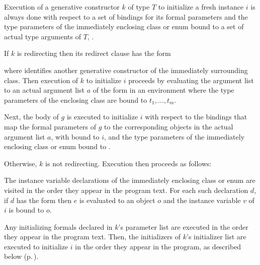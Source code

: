 \documentclass[makeidx]{article}
\begin{document}
\LMHash{}%
%
Execution of a generative constructor $k$ of type $T$
to initialize a fresh instance $i$
is always done with respect to a set of bindings for its formal parameters
and the type parameters of the immediately enclosing class or enum bound to
a set of actual type arguments of $T$, .


\LMHash{}%
If $k$ is redirecting then its redirect clause has the form

\noindent
{}

where  identifies another generative constructor
of the immediately surrounding class.
Then execution of $k$ to initialize $i$ proceeds by
evaluating the argument list
to an actual argument list $a$ of the form
in an environment where the
type parameters of the enclosing class are bound to
$t_1, \ldots, t_m$.

\LMHash{}%
Next, the body of $g$ is executed to initialize $i$
with respect to the bindings that map
the formal parameters of $g$ to the corresponding objects
in the actual argument list $a$,
with \THIS{} bound to $i$,
and the type parameters of the immediately enclosing class or enum bound to
.

\LMHash{}%
Otherwise, $k$ is not redirecting.
Execution then proceeds as follows:

\LMHash{}%
The instance variable declarations of the immediately enclosing class or enum
are visited in the order they appear in the program text.
For each such declaration $d$, if $d$ has the form
then $e$ is evaluated to an object $o$
and the instance variable $v$ of $i$ is bound to $o$.

\LMHash{}%
Any initializing formals declared in $k$'s parameter list
are executed in the order they appear in the program text.
Then, the initializers of $k$'s initializer list are executed to initialize $i$
in the order they appear in the program, as described below
(p.\,\pageref{executionOfInitializerLists}).
\end{document}
